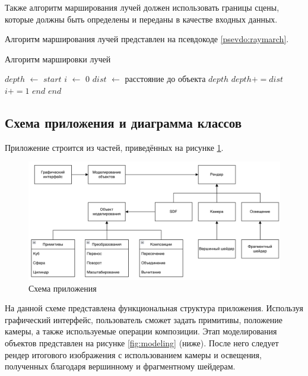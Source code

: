 Также  алгоритм марширования лучей  должен  использовать  границы  сцены, 
которые  должны  быть  определены  и  переданы  в  качестве  входных  данных.

Алгоритм марширования лучей представлен на псевдокоде \ref{psevdo:raymarch}.
\begin{algorithm}
	\caption{Алгоритм маршировки лучей}\label{psevdo:raymarch}
	\begin{algorithmic}[1]
		\State $depth$ $\leftarrow$ $start$
		\State $i$ $\leftarrow$ $0$
		\State $dist$ $\leftarrow$ расстояние до объекта
		\State \Return $depth$
		\EndIf
		\State $depth += dist$
		\State $i += 1$
		\State \Return $end$
		\EndIf
		\EndWhile
		\State \Return $end$
		\EndFunction
	\end{algorithmic}
\end{algorithm}

\subsection{Схема приложения и диаграмма классов}

Приложение строится из частей, приведённых на рисунке \ref{fig:app}.
\clearpage

\begin{figure}[h]
	\centering
	\captionsetup{justification=centering}
	\includegraphics[width=160mm]{img/app.png}
	\caption{Схема приложения}
	\label{fig:app}
\end{figure}

На  данной  схеме  представлена  функциональная  структура  приложения.
Используя  графический  интерфейс,  пользователь  сможет  задать  примитивы, 
положение  камеры,  а  также  используемые  операции  композиции.
Этап моделирования  объектов  представлен  на  рисунке  \ref{fig:modeling} (ниже).
После  него  следует рендер  итогового  изображения  с  использованием  камеры  и  освещения, полученных благодаря вершинному и фрагментному шейдерам.

